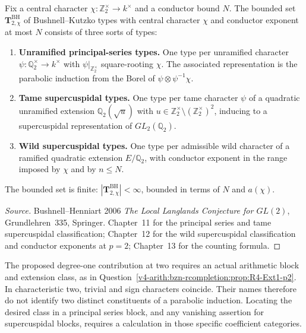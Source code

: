 \begin{proposition}[Bushnell--Henniart 2006 classification at \(p=2\)]
\label{v4-arith:f1a3-BH:prop:BH-types-p2}
Fix a central character
\(\chi\colon\mathbb{Z}_{2}^{\times}\to k^{\times}\) and a conductor
bound \(N\). The bounded set
\(\mathbf{T}^{\mathrm{BH}}_{2,\chi}\) of Bushnell--Kutzko types with
central character \(\chi\) and conductor exponent at most \(N\)
consists of three sorts of types:
\begin{enumerate}
\item \textbf{Unramified principal-series types.} One type per
unramified character \(\psi\colon\mathbb{Q}_{2}^{\times}\to k^{\times}\)
with \(\psi|_{\mathbb{Z}_{2}^{\times}}\) square-rooting \(\chi\). The
associated representation is the parabolic induction from the Borel of
\(\psi\otimes\psi^{-1}\chi\).
\item \textbf{Tame supercuspidal types.} One type per tame character
\(\psi\) of a quadratic unramified extension \(\mathbb{Q}_{2}(\sqrt{u})\)
with \(u\in\mathbb{Z}_{2}^{\times}\setminus(\mathbb{Z}_{2}^{\times})^{2}\),
inducing to a supercuspidal representation of \(GL_{2}(\mathbb{Q}_{2})\).
\item \textbf{Wild supercuspidal types.} One type per admissible wild
character of a ramified quadratic extension \(E/\mathbb{Q}_{2}\), with
conductor exponent in the range imposed by \(\chi\) and by \(n\leq N\).
\end{enumerate}
The bounded set is finite:
\(|\mathbf{T}^{\mathrm{BH}}_{2,\chi}|<\infty\), bounded in terms of
\(N\) and \(a(\chi)\).
\end{proposition}

\begin{proof}[Source]
Bushnell--Henniart 2006 \emph{The Local Langlands Conjecture for
\(GL(2)\)}, Grundlehren~335, Springer. Chapter~11 for the principal series
and tame supercuspidal classification; Chapter~12 for the wild
supercuspidal classification and conductor exponents at \(p=2\);
Chapter~13 for the counting formula.
\end{proof}

\begin{remark}[the Ext\({}^{1}\)-carrying type at \(p=2\)]
\label{v4-arith:f1a3-BH:rem:ext1-type-p2}
The proposed degree-one contribution at two requires an actual
arithmetic block and extension class, as in
Question~\ref{v4-arith:bzn-rcompletion:prop:R4-Ext1-p2}.
In characteristic two, trivial and sign characters coincide.
Their names therefore do not identify two distinct constituents of
a parabolic induction. Locating the desired class in a principal
series block, and any vanishing assertion for supercuspidal blocks,
requires a calculation in those specific coefficient categories.
\end{remark}

